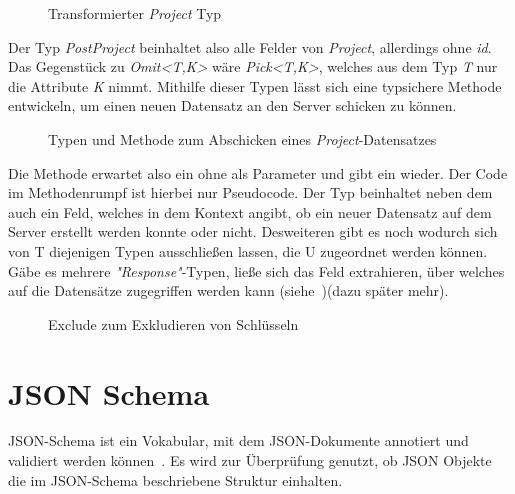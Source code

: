 \begin{figure}[h]
    
    \caption{Transformierter \emph{Project} Typ}
    \label{fig:basics:typescript:4}
\end{figure}

Der Typ \emph{PostProject} beinhaltet also alle Felder von \emph{Project}, allerdings ohne \emph{id}. Das Gegenstück zu \emph{Omit<T,K>} wäre \emph{Pick<T,K>},
welches aus dem Typ \emph{T} nur die Attribute \emph{K} nimmt. Mithilfe dieser Typen lässt sich eine typsichere Methode entwickeln,
um einen neuen Datensatz an den Server schicken zu können.

\begin{figure}[h]
    
    \caption{Typen und Methode zum Abschicken eines \emph{Project}-Datensatzes}
    \label{fig:basics:typescript:5}
\end{figure}

Die Methode  erwartet also ein  ohne  als Parameter und gibt ein  wieder.
Der Code im Methodenrumpf ist hierbei nur Pseudocode. Der Typ  beinhaltet neben dem  auch ein  Feld,
welches in dem Kontext angibt, ob ein neuer Datensatz auf dem Server erstellt werden konnte oder nicht.
Desweiteren gibt es noch  wodurch sich von T diejenigen Typen ausschließen lassen,
die U zugeordnet werden können. Gäbe es mehrere \emph{"Response"}-Typen, ließe sich das Feld extrahieren,
über welches auf die Datensätze zugegriffen werden kann (siehe~)(dazu später mehr).

\begin{figure}[h]
    
    \caption{Exclude zum Exkludieren von Schlüsseln}
    \label{fig:basics:typescript:6}
\end{figure}


\section{JSON Schema}
\label{sec:basics:jsonschema}
JSON-Schema ist ein Vokabular, mit dem JSON-Dokumente  annotiert und validiert werden können~\cite{json-schema}.
Es wird zur Überprüfung genutzt, ob JSON Objekte die im JSON-Schema beschriebene Struktur einhalten.

